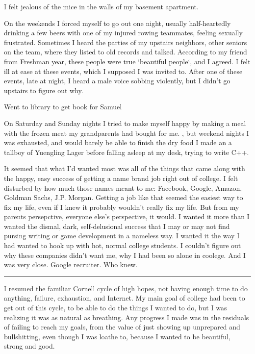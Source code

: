 I felt jealous of the mice in the walls of my basement apartment.

On the weekends I forced myself to go out one night, usually half-heartedly
drinking a few beers with one of my injured rowing teammates, feeling sexually
frustrated.  Sometimes I heard the parties of my upstairs neighbors, other
seniors on the team, where they listed to old records and talked.  According to
my friend from Freshman year, these people were true `beautiful people`, and I
agreed.  I felt ill at ease at these events, which I supposed I was invited to.
After one of these events, late at night, I heard a male voice sobbing
violently, but I didn't go upstairs to figure out why.

Went to library to get book for Samuel

On Saturday and Sunday nights I tried to make myself happy by making a meal with
the frozen meat my grandparents had bought for me.  , but weekend nights I was exhausted, and would barely
be able to finish the dry food I made an a tallboy of Yuengling Lager before
falling asleep at my desk, trying to write C++.

It seemed that what I'd wanted most was all of the things that came along with
the happy, easy success of getting a name brand job right out of college.  I
felt disturbed by how much those names meant to me: Facebook, Google, Amazon,
Goldman Sachs, J.P. Morgan.  Getting a job like that seemed the easiest way to
fix my life, even if I knew it probably wouldn't really fix my life.  But from
my parents persepctive, everyone else's perspective, it would.  I wanted it more
than I wanted the dismal, dark, self-delusional success that I may or may not
find pursing writing or game development in a nameless way.  I wanted it the way
I had wanted to hook up with hot, normal college students.  I couldn't figure
out why these companies didn't want me, why I had been so alone in coolege.  And
I was very close.  Google recruiter.  Who knew.

\plainfancybreak{12pt}{2}{* * *}

I resumed the familiar Cornell cycle of high hopes, not having enough time to do
anything, failure, exhaustion, and Internet.  My main goal of college had been
to get out of this cycle, to be able to do the things I wanted to do, but I was
realizing it was as natural as breathing.  Any progress I made was in the
residuals of failing to reach my goals, from the value of just showing up
unprepared and bullshitting, even though I was loathe to, because I wanted to be
beautiful, strong and good.

